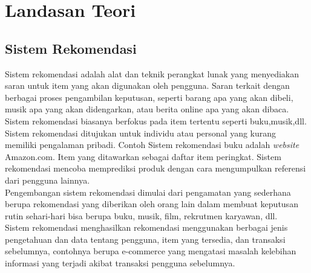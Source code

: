 \chapter{Landasan Teori}
\label{chap:teori}
\section{Sistem Rekomendasi}
\label{sec:sistem rekomendasi}

Sistem rekomendasi adalah alat dan teknik perangkat lunak yang menyediakan saran untuk item yang akan digunakan oleh pengguna. Saran terkait dengan berbagai proses pengambilan keputusan, seperti barang apa yang akan dibeli, musik apa yang akan didengarkan, atau berita online apa yang akan dibaca.\\ %

Sistem rekomendasi biasanya berfokus pada item tertentu seperti buku,musik,dll. Sistem rekomendasi ditujukan untuk individu atau personal yang kurang memiliki pengalaman pribadi. Contoh Sistem rekomendasi buku adalah \textit{website} Amazon.com. Item yang ditawarkan sebagai daftar item peringkat. Sistem rekomendasi mencoba memprediksi produk dengan cara mengumpulkan referensi dari pengguna lainnya.\\ %

Pengembangan sistem rekomendasi dimulai dari pengamatan yang sederhana berupa rekomendasi yang diberikan oleh orang lain dalam membuat keputusan rutin sehari-hari bisa berupa buku, musik, film, rekrutmen karyawan, dll.\\ %

Sistem rekomendasi menghasilkan rekomendasi menggunakan berbagai jenis pengetahuan dan data tentang pengguna, item yang tersedia, dan transaksi sebelumnya, contohnya berupa e-commerce yang mengatasi masalah kelebihan informasi yang terjadi akibat transaksi pengguna sebelumnya. \\ %


